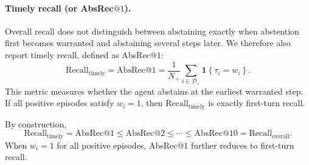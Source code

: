 \documentclass{llmxive}
\providecommand{\ind}[1]{\mathbf{1}\!\left\{#1\right\}}
\begin{document}
\paragraph{Timely recall (or AbsRec\texorpdfstring{$@1$}{@1}).}
Overall recall does not distinguish between abstaining exactly when abstention first becomes warranted and abstaining several steps later. We therefore also report timely recall, defined as AbsRec@$1$:
\begin{equation}
\mathrm{Recall}_{\mathrm{timely}}
=
\mathrm{AbsRec}@1
=
\frac{1}{N_{+}}
\sum_{i \in \mathcal{D}_{+}}
\ind{\tau_i = w_i}.
\label{eq:recall_timely}
\end{equation}
This metric measures whether the agent abstains at the earliest warranted step. If all positive episodes satisfy $w_i=1$, then $\mathrm{Recall}_{\mathrm{timely}}$ is exactly first-turn recall.

By construction,
\begin{equation}
\mathrm{Recall}_{\mathrm{timely}}
=
\mathrm{AbsRec}@1
\le
\mathrm{AbsRec}@2
\le
\cdots
\le
\mathrm{AbsRec}@10
=
\mathrm{Recall}_{\mathrm{overall}}.
\label{eq:absrec_relation}
\end{equation}
When $w_i=1$ for all positive episodes, AbsRec@$1$ further reduces to first-turn recall.


\end{document}
